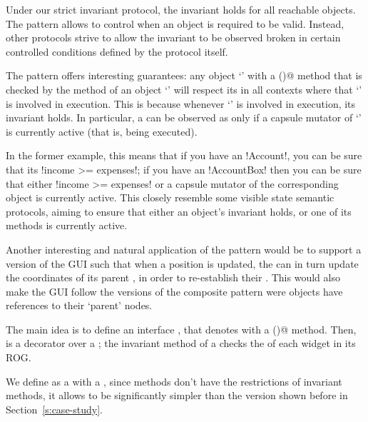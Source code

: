 Under our strict invariant protocol, the invariant holds for all reachable objects.
The \Q@subInvariant@ pattern allows to control when an object is required to be valid.
Instead, other protocols strive to allow the invariant to be observed broken in certain controlled conditions defined by the protocol itself.

The \Q@subInvariant@ pattern offers interesting guarantees:
any object `\Q@a@' with a \Q@subInvariant()@ method that is checked by the \Q@invariant@ method of an object `\Q@b@'
will respect its \Q@subInvariant@ in all contexts where that `\Q@b@' is involved in execution.
This is because whenever `\Q@b@' is involved in execution, its invariant holds.
In particular, a \Q@subInvariant@ can be observed as \Q@false@ only if a capsule mutator of `\Q@b@' is currently active (that is, being executed).

In the former example, this means that
if you have an \Q!Account!, you can be sure that its \Q!income >= expenses!;
if you have an \Q!AccountBox! then you can be sure that either \Q!income >= expenses! or 
a capsule mutator of the corresponding \Q@Account@ object is currently active.
This closely resemble some visible state semantic protocols, aiming to ensure that  
either an object's invariant holds, or one of its methods is currently active.


Another interesting and natural application of the \Q@subInvariant@ pattern would be to support a version of the GUI such that when a \Q@Widget@s position is updated, the \Q@Widget@ can in turn update the coordinates of its parent \Q@Widget@s, in order to re-establish their \Q@subInvariants@.
This would also make the GUI follow the versions of the composite pattern were objects have references to their `parent' nodes.

The main idea is to define an interface \Q@HasSubInvariant@, that denotes \Q@Widgets@ with a \Q@subInvariant()@ method. Then, \Q@WidgetWithInvariant@ is a decorator over a \Q@Widget@; the invariant method of a \Q@WidgetWithInvariant@ checks the \Q@subInvariant@ of each widget in its ROG.

We define \Q@SafeMovable@ as a \Q@Widget@ with a \Q@subInvariant@, since \Q@subInvariant@ methods don't have the restrictions of invariant methods, it allows \Q@SafeMovable\@ to be significantly simpler than the version shown before in Section~\ref{s:case-study}.

